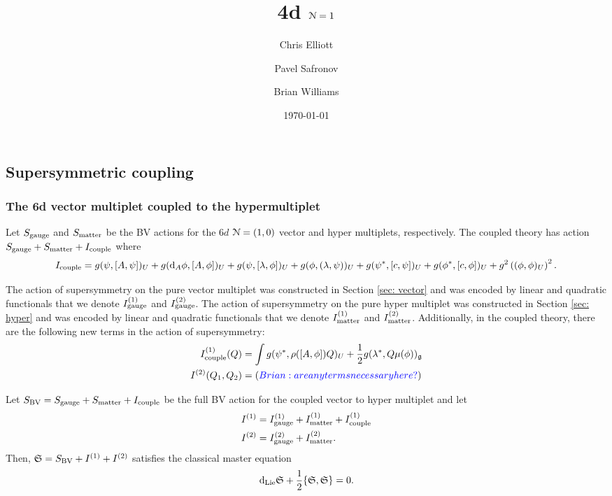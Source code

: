 \documentclass[10pt, oneside]{article}
\title{4d $\mathcal N=1$}
\author{Chris Elliott\and Pavel Safronov \and Brian Williams}
\date{\today}
\begin{document}
\maketitle

\subsection{Supersymmetric coupling}
\subsubsection{The 6d vector multiplet coupled to the hypermultiplet}

Let $S_{\rm gauge}$ and $S_{\rm matter}$ be the BV actions for the $6d$ $\mathcal N=(1,0)$ vector and hyper multiplets, respectively. 
The coupled theory has action $S_{\rm gauge} + S_{\rm matter} + I_{\rm couple}$ where
\[
I_{\rm couple} = g (\psi, [A, \psi])_U + g ({\rm d}_{A} \phi, [A,\phi])_U + g (\psi, [\lambda, \phi])_U + g (\phi, (\lambda, \psi))_U + g (\psi^*, [c, \psi])_U + g (\phi^*, [c, \phi])_U + g^2 \left((\phi, \phi)_U\right)^2 .
\]

The action of supersymmetry on the pure vector multiplet was constructed in Section \ref{sec: vector} and was encoded by linear and quadratic functionals that we denote $I^{(1)}_{\rm gauge}$ and $I^{(2)}_{\rm gauge}$. 
The action of supersymmetry on the pure hyper multiplet was constructed in Section \ref{sec: hyper} and was encoded by linear and quadratic functionals that we denote $I^{(1)}_{\rm matter}$ and $I^{(2)}_{\rm matter}$. 
Additionally, in the coupled theory, there are the following new terms in the action of supersymmetry:
\begin{align*}
I^{(1)}_{\rm couple} (Q) & = \int g (\psi^*, \rho([A, \phi]) Q)_U + \frac{1}{2} g (\lambda^*, Q \mu(\phi))_\mathfrak g \\
I^{(2)} (Q_1 , Q_2) & =  (\textcolor{blue}{Brian: are any terms necessary here?})
\end{align*}

\begin{thm}
Let $S_{\rm BV} = S_{\rm gauge} + S_{\rm matter} + I_{\rm couple}$ be the full BV action for the coupled vector to hyper multiplet and let
\begin{align*}
I^{(1)} & = I^{(1)}_{\rm gauge} + I^{(1)}_{\rm matter} + I^{(1)}_{\rm couple} \\
I^{(2)} & = I^{(2)}_{\rm gauge} + I^{(2)}_{\rm matter} .
\end{align*}
Then, $\mathfrak S = S_{\rm BV} + I^{(1)} + I^{(2)}$ satisfies the classical master equation
\begin{equation}\label{CMEcouple}
{\rm d}_{\rm Lie} \mathfrak S + \frac{1}{2} \{\mathfrak S, \mathfrak S\} = 0 .
\end{equation}
\end{thm}
\end{document}

